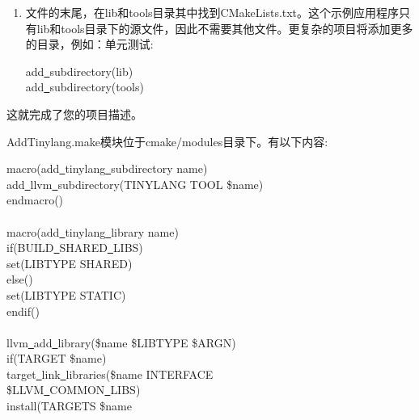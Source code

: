 \begin{enumerate}
\item 文件的末尾，在lib和tools目录其中找到CMakeLists.txt。这个示例应用程序只有lib和tools目录下的源文件，因此不需要其他文件。更复杂的项目将添加更多的目录，例如：单元测试:
\begin{tcolorbox}[colback=white,colframe=black]
add\underline{~}subdirectory(lib) \\
add\underline{~}subdirectory(tools)
\end{tcolorbox}
\end{enumerate}

这就完成了您的项目描述。\par

AddTinylang.make模块位于cmake/modules目录下。有以下内容:\par

\begin{tcolorbox}[colback=white,colframe=black]
macro(add\underline{~}tinylang\underline{~}subdirectory name) \\
\hspace*{0.5cm}add\underline{~}llvm\underline{~}subdirectory(TINYLANG TOOL \${name}) \\
endmacro() \\
\\
macro(add\underline{~}tinylang\underline{~}library name) \\
\hspace*{0.5cm}if(BUILD\underline{~}SHARED\underline{~}LIBS) \\
\hspace*{1cm}set(LIBTYPE SHARED) \\
\hspace*{0.5cm}else() \\
\hspace*{1cm}set(LIBTYPE STATIC) \\
\hspace*{0.5cm}endif() \\
\\
\hspace*{0.5cm}llvm\underline{~}add\underline{~}library(\${name} \${LIBTYPE} \${ARGN}) \\
\hspace*{0.5cm}if(TARGET \${name}) \\
\hspace*{1cm}target\underline{~}link\underline{~}libraries(\${name} INTERFACE  \\
\hspace*{1.5cm}\${LLVM\underline{~}COMMON\underline{~}LIBS})  \\
\hspace*{1cm}install(TARGETS \${name}  \\

\end{tcolorbox}
